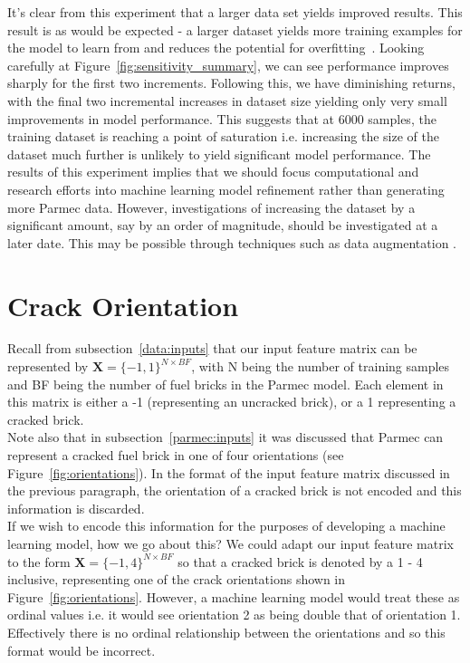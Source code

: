 \noindent
It's clear from this experiment that a larger data set yields improved results. This result is as would be expected - a larger dataset yields more training examples for the model to learn from and reduces the potential for overfitting~\cite{hawkins2004problem}.  Looking carefully at Figure~\ref{fig:sensitivity_summary}, we can see performance improves sharply for the first two increments. Following this, we have diminishing returns, with the final two incremental increases in dataset size yielding only very small improvements in model performance.  This suggests that at 6000 samples,  the training dataset is reaching a point of saturation i.e. increasing the size of the dataset much further is unlikely to yield significant model performance. The results of this experiment implies that we should focus computational and research efforts into machine learning model refinement rather than generating more Parmec data. However, investigations of increasing the dataset by a significant amount, say by an order of magnitude, should be investigated at a later date. This may be possible through techniques such as data augmentation \cite{shorten2019survey}.


\section{Crack Orientation}

Recall from subsection~\ref{data:inputs} that our input feature matrix can be represented by $\textbf{X} = \{-1, 1\}^{N \times BF}$, with N being the number of training samples and BF being the number of fuel bricks in the Parmec model. Each element in this matrix is either a -1 (representing an uncracked brick), or a 1 representing a cracked brick. 
\\

\noindent
Note also that in subsection~\ref{parmec:inputs} it was discussed that Parmec can represent a cracked fuel brick in one of four orientations (see Figure~\ref{fig:orientations}). In the format of the input feature matrix discussed in the previous paragraph, the orientation of a cracked brick is not encoded and this information is discarded. 
\\

\noindent
If we wish to encode this information for the purposes of  developing a machine learning model, how we go about this? We could adapt our input feature matrix to the form $\textbf{X} = \{-1, 4\}^{N \times BF}$ so that a cracked brick is denoted by a 1 - 4 inclusive, representing one of the crack orientations shown in Figure~\ref{fig:orientations}. However, a machine learning model would treat these as ordinal values i.e. it would see orientation 2 as being double that of orientation 1. Effectively there is no ordinal relationship between the orientations and so this format would be incorrect.\\ 

